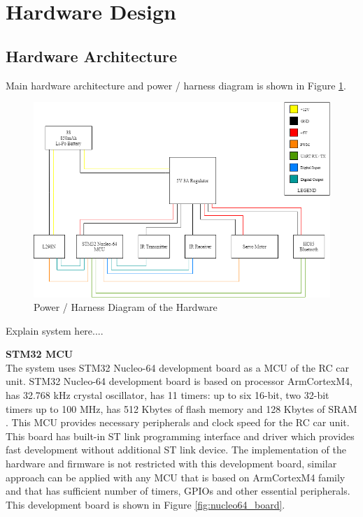 \section{Hardware Design} \label{sec_hardware_design}

\subsection{Hardware Architecture} \label{sec_hardware_architecture}

Main hardware architecture and power / harness diagram is shown in Figure \ref{fig:hardware_architecture}. 

\begin{figure}[!htbp]
    \centering
    \includegraphics[width=1\textwidth]{Imgs/ana_devre_v3.png}
    \caption{\label{fig:hardware_architecture}Power / Harness Diagram of the Hardware}
\end{figure}

Explain system here....

\noindent \textbf{STM32 MCU} \\
The system uses STM32 Nucleo-64 development board as a MCU of the RC car unit. STM32 Nucleo-64 development board is based on processor Arm\textregistered\;Cortex\textregistered\;M4, has 32.768 kHz crystal oscillator,  has 11 timers: up to six 16-bit, two 32-bit timers up to 100 MHz, has 512 Kbytes of flash memory and 128 Kbytes of SRAM \cite{One}. This MCU provides necessary peripherals and clock speed for the RC car unit. This board has built-in ST link programming interface and driver which provides fast development without additional ST link device. The implementation of the hardware and firmware is not restricted with this development board, similar approach can be applied with any MCU that is based on Arm\textregistered\;Cortex\textregistered\;M4 family and that has sufficient number of timers, GPIOs and other essential peripherals. This development board is shown in Figure \ref{fig:nucleo64_board}.\\

